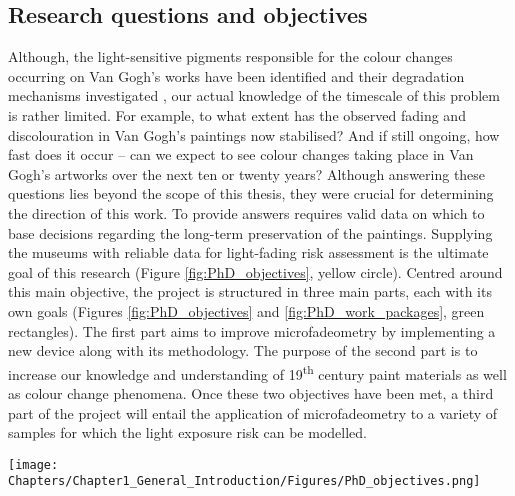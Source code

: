 \subsection{Research questions and objectives}



Although, the light-sensitive pigments responsible for the colour changes occurring on Van Gogh's works have been identified and their degradation mechanisms investigated \citep{bommel_investigation_2005, burnstock_comparison_2005, monico_degradation_2013-1}, our actual knowledge of the timescale of this problem is rather limited. For example, to what extent has the observed fading and discolouration in Van Gogh’s paintings now stabilised? And if still ongoing, how fast does it occur – can we expect to see colour changes taking place in Van Gogh's artworks over the next ten or twenty years? Although answering these questions lies beyond the scope of this thesis, they were crucial for determining the direction of this work. To provide answers requires valid data on which to base decisions regarding the long-term preservation of the paintings. Supplying the museums with reliable data for light-fading risk assessment is the ultimate goal of this research (Figure \ref{fig:PhD_objectives}, yellow circle). Centred around this main objective, the project is structured in three main parts, each with its own goals (Figures \ref{fig:PhD_objectives} and \ref{fig:PhD_work_packages}, green rectangles). The first part aims to improve microfadeometry by implementing a new device along with its methodology. The purpose of the second part is to increase our knowledge and understanding of 19\textsuperscript{th} century paint materials as well as colour change phenomena. Once these two objectives have been met, a third part of the project will entail the application of microfadeometry to a variety of samples for which the light exposure risk can be modelled. \\

\begin{figure*} %
\centering
\texttt{[image: Chapters/Chapter1\_General\_Introduction/Figures/PhD\_objectives.png]}
\caption[\hspace{0.3cm}Objectives of the PhD]{Objectives of the PhD.}
\label{fig:PhD_objectives}
\end{figure*}

